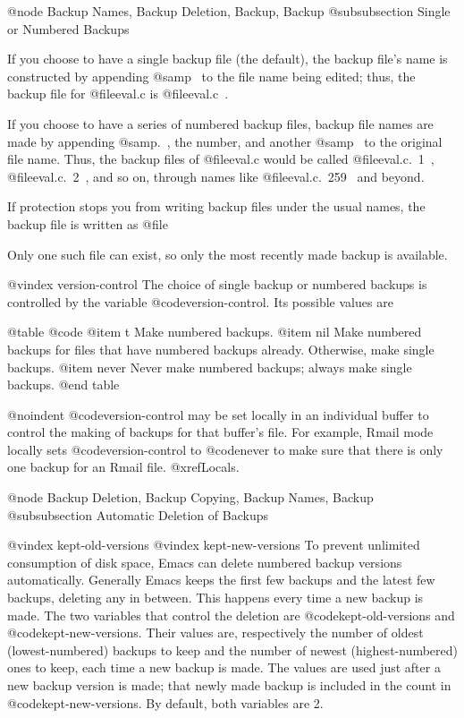 {{{{{{{{{{{{{{{{@node Backup Names, Backup Deletion, Backup, Backup
@subsubsection Single or Numbered Backups

  If you choose to have a single backup file (the default),
the backup file's name is constructed by appending @samp{~} to the
file name being edited; thus, the backup file for @file{eval.c} is
@file{eval.c~}.

  If you choose to have a series of numbered backup files, backup file
names are made by appending @samp{.~}, the number, and another @samp{~} to
the original file name.  Thus, the backup files of @file{eval.c} would be
called @file{eval.c.~1~}, @file{eval.c.~2~}, and so on, through names
like @file{eval.c.~259~} and beyond.

  If protection stops you from writing backup files under the usual names,
the backup file is written as @file{%
Only one such file can exist, so only the most recently made backup is
available.

@vindex version-control
  The choice of single backup or numbered backups is controlled by the
variable @code{version-control}.  Its possible values are

@table @code
@item t
Make numbered backups.
@item nil
Make numbered backups for files that have numbered backups already.
Otherwise, make single backups.
@item never
Never make numbered backups; always make single backups.
@end table

@noindent
@code{version-control} may be set locally in an individual buffer to
control the making of backups for that buffer's file.  For example,
Rmail mode locally sets @code{version-control} to @code{never} to make sure
that there is only one backup for an Rmail file.  @xref{Locals}.

@node Backup Deletion, Backup Copying, Backup Names, Backup
@subsubsection Automatic Deletion of Backups

@vindex kept-old-versions
@vindex kept-new-versions
  To prevent unlimited consumption of disk space, Emacs can delete numbered
backup versions automatically.  Generally Emacs keeps the first few backups
and the latest few backups, deleting any in between.  This happens every
time a new backup is made.  The two variables that control the deletion are
@code{kept-old-versions} and @code{kept-new-versions}.  Their values are, respectively
the number of oldest (lowest-numbered) backups to keep and the number of
newest (highest-numbered) ones to keep, each time a new backup is made.
The values are used just after a new backup version is made;
that newly made backup is included in the count in @code{kept-new-versions}.
By default, both variables are 2.

}}}}}}}}}}}}}}}}}
